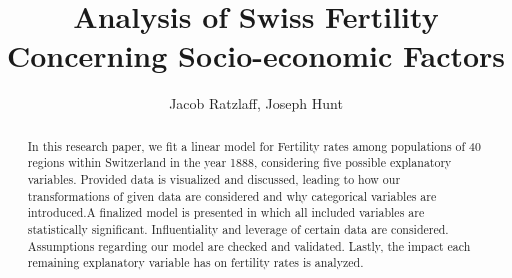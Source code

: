 \documentclass[preprint,12pt]{elsarticle}
\begin{document}
\begin{frontmatter}


\title{Analysis of Swiss Fertility Concerning Socio-economic Factors}




\author{Jacob Ratzlaff, Joseph Hunt}

\address{Colorado School of Mines}

\begin{abstract}
In this research paper, we fit a linear model for Fertility rates among populations of 40 regions within Switzerland in the year 1888, considering five possible explanatory variables. Provided data is visualized and discussed, leading to how our transformations of given data are considered and why categorical variables are introduced.A finalized model is presented in which all included variables are statistically significant. Influentiality and leverage of certain data are considered. Assumptions regarding our model are checked and validated. Lastly, the impact each remaining explanatory variable has on fertility rates is analyzed.
\end{abstract}



\end{frontmatter}
\end{document}
